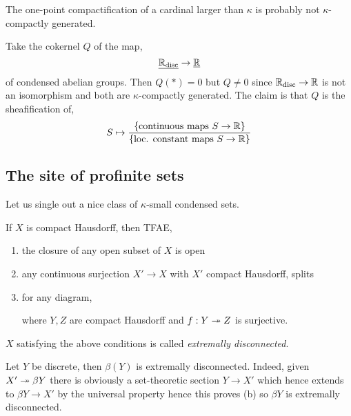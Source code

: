 \documentclass[12pt]{article}
\newcommand{\disc}{\text{disc}}
\begin{document}
\begin{rmk}
The one-point compactification of a cardinal larger than $\kappa$ is probably not $\kappa$-compactly generated. 
\end{rmk}

\begin{example}
Take the cokernel $Q$ of the map,
\[ \underline{\RR_{\disc}} \to \underline{\RR} \]
of condensed abelian groups. Then $Q(*) = 0$ but $Q \neq 0$ since $\RR_{\disc} \to \RR$ is not an isomorphism and both are $\kappa$-compactly generated. The claim is that $Q$ is the sheafification of,
\[ S \mapsto \frac{ \{ \text{continuous maps } S \to \mathbb{R} \} }{ \{ \text{loc. constant maps } S \to \mathbb{R}  \}} \]
\end{example}

\subsection{The site of profinite sets}

Let us single out a nice class of $\kappa$-small condensed sets.

\begin{prop}[08YN] If $X$ is compact Hausdorff, then TFAE,
\begin{enumerate}
\item the closure of any open subset of $X$ is open

\item any continuous surjection $X' \to X$ with $X'$ compact Hausdorff, splits

\item for any diagram,
\begin{center}
\end{center}
where $Y, Z$ are compact Hausdorff and $f : Y \twoheadrightarrow Z$ is surjective. 
\end{enumerate}
\end{prop}

\begin{defn}
$X$ satisfying the above conditions is called \textit{extremally disconnected}.
\end{defn}

\begin{example}
Let $Y$ be discrete, then $\beta(Y)$ is extremally disconnected. Indeed,
given $X' \twoheadrightarrow \beta Y$ there is obviously a set-theoretic section $Y \to X'$ which hence extends to $\beta Y \to X'$ by the universal property hence this proves (b) so $\beta Y$ is extremally disconnected.
\end{example}
\end{document}
